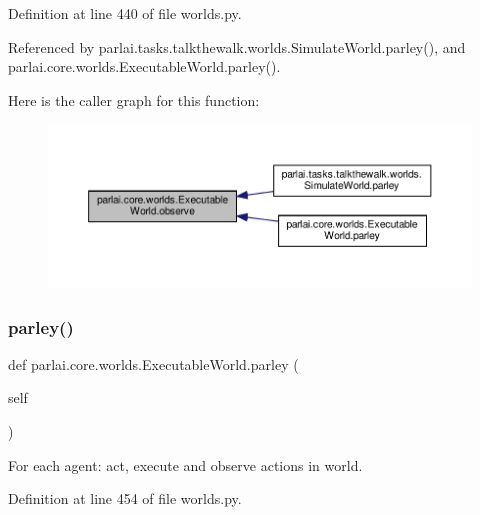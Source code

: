 Definition at line 440 of file worlds.\+py.



Referenced by parlai.\+tasks.\+talkthewalk.\+worlds.\+Simulate\+World.\+parley(), and parlai.\+core.\+worlds.\+Executable\+World.\+parley().

Here is the caller graph for this function\+:
\nopagebreak
\begin{figure}[H]
\begin{center}
\leavevmode
\includegraphics[width=350pt]{classparlai_1_1core_1_1worlds_1_1ExecutableWorld_a69934ec2181a8b22269e02ab8b3bb1f2_icgraph}
\end{center}
\end{figure}
\mbox{\label{classparlai_1_1core_1_1worlds_1_1ExecutableWorld_a6555592d2b7c316e72febc1fccf43bdb}} 
\subsubsection{\texorpdfstring{parley()}{parley()}}
{\footnotesize\ttfamily def parlai.\+core.\+worlds.\+Executable\+World.\+parley (\begin{DoxyParamCaption}\item[{}]{self }\end{DoxyParamCaption})}

\begin{DoxyVerb}For each agent: act, execute and observe actions in world.\end{DoxyVerb}
 

Definition at line 454 of file worlds.\+py.



